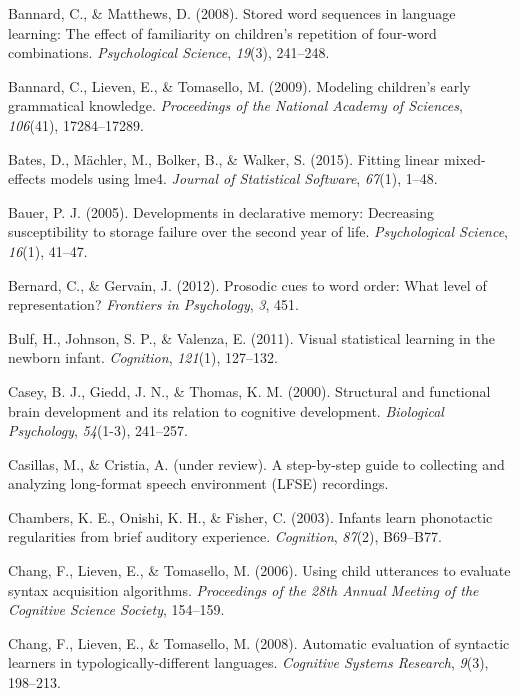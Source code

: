 \documentclass[man,mask,floatsintext]{apa6}
\theoremstyle{definition}
\theoremstyle{definition}
\theoremstyle{definition}
\theoremstyle{remark}
\begin{document}
\hypertarget{ref-bannard2008stored}{}
Bannard, C., \& Matthews, D. (2008). Stored word sequences in language
learning: The effect of familiarity on children's repetition of
four-word combinations. \emph{Psychological Science}, \emph{19}(3),
241--248.

\hypertarget{ref-bannard2009modeling}{}
Bannard, C., Lieven, E., \& Tomasello, M. (2009). Modeling children's
early grammatical knowledge. \emph{Proceedings of the National Academy
of Sciences}, \emph{106}(41), 17284--17289.

\hypertarget{ref-lme4}{}
Bates, D., Mächler, M., Bolker, B., \& Walker, S. (2015). Fitting linear
mixed-effects models using lme4. \emph{Journal of Statistical Software},
\emph{67}(1), 1--48.

\hypertarget{ref-bauer2005developments}{}
Bauer, P. J. (2005). Developments in declarative memory: Decreasing
susceptibility to storage failure over the second year of life.
\emph{Psychological Science}, \emph{16}(1), 41--47.

\hypertarget{ref-bernard2012prosodic}{}
Bernard, C., \& Gervain, J. (2012). Prosodic cues to word order: What
level of representation? \emph{Frontiers in Psychology}, \emph{3}, 451.

\hypertarget{ref-bulf2011visual}{}
Bulf, H., Johnson, S. P., \& Valenza, E. (2011). Visual statistical
learning in the newborn infant. \emph{Cognition}, \emph{121}(1),
127--132.

\hypertarget{ref-casey2000structural}{}
Casey, B. J., Giedd, J. N., \& Thomas, K. M. (2000). Structural and
functional brain development and its relation to cognitive development.
\emph{Biological Psychology}, \emph{54}(1-3), 241--257.

\hypertarget{ref-casillasURstep}{}
Casillas, M., \& Cristia, A. (under review). A step-by-step guide to
collecting and analyzing long-format speech environment (LFSE)
recordings.

\hypertarget{ref-chambers2003infants}{}
Chambers, K. E., Onishi, K. H., \& Fisher, C. (2003). Infants learn
phonotactic regularities from brief auditory experience.
\emph{Cognition}, \emph{87}(2), B69--B77.

\hypertarget{ref-chang2006using}{}
Chang, F., Lieven, E., \& Tomasello, M. (2006). Using child utterances
to evaluate syntax acquisition algorithms. \emph{Proceedings of the 28th
Annual Meeting of the Cognitive Science Society}, 154--159.

\hypertarget{ref-chang2008automatic}{}
Chang, F., Lieven, E., \& Tomasello, M. (2008). Automatic evaluation of
syntactic learners in typologically-different languages. \emph{Cognitive
Systems Research}, \emph{9}(3), 198--213.
\end{document}
